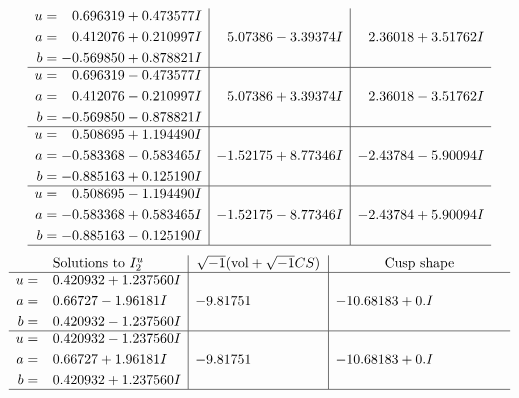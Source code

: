 \documentclass[1p]{elsarticle_modified}
\theoremstyle{definition}
\newcommand{\I}{\sqrt{-1}}
\begin{document}
$$\begin{array}{c|c|c}
\begin{aligned}
u &= \phantom{-}0.696319 + 0.473577 I \\
a &= \phantom{-}0.412076 + 0.210997 I \\
b &= -0.569850 + 0.878821 I\end{aligned}
 & \phantom{-}5.07386 - 3.39374 I & \phantom{-}2.36018 + 3.51762 I \\ \hline\begin{aligned}
u &= \phantom{-}0.696319 - 0.473577 I \\
a &= \phantom{-}0.412076 - 0.210997 I \\
b &= -0.569850 - 0.878821 I\end{aligned}
 & \phantom{-}5.07386 + 3.39374 I & \phantom{-}2.36018 - 3.51762 I \\ \hline\begin{aligned}
u &= \phantom{-}0.508695 + 1.194490 I \\
a &= -0.583368 - 0.583465 I \\
b &= -0.885163 + 0.125190 I\end{aligned}
 & -1.52175 + 8.77346 I & -2.43784 - 5.90094 I \\ \hline\begin{aligned}
u &= \phantom{-}0.508695 - 1.194490 I \\
a &= -0.583368 + 0.583465 I \\
b &= -0.885163 - 0.125190 I\end{aligned}
 & -1.52175 - 8.77346 I & -2.43784 + 5.90094 I\\
 \hline 
 \end{array}$$\newpage$$\begin{array}{c|c|c}  
\text{Solutions to }I^u_{2}& \I (\text{vol} + \sqrt{-1}CS) & \text{Cusp shape}\\
 \hline 
\begin{aligned}
u &= \phantom{-}0.420932 + 1.237560 I \\
a &= \phantom{-}0.66727 - 1.96181 I \\
b &= \phantom{-}0.420932 - 1.237560 I\end{aligned}
 & -9.81751\phantom{ +0.000000I} & -10.68183 + 0. I\phantom{ +0.000000I} \\ \hline\begin{aligned}
u &= \phantom{-}0.420932 - 1.237560 I \\
a &= \phantom{-}0.66727 + 1.96181 I \\
b &= \phantom{-}0.420932 + 1.237560 I\end{aligned}
 & -9.81751\phantom{ +0.000000I} & -10.68183 + 0. I\phantom{ +0.000000I}\\
 \hline 
 \end{array}$$\newpage\newpage\renewcommand{\arraystretch}{1}
\end{document}

